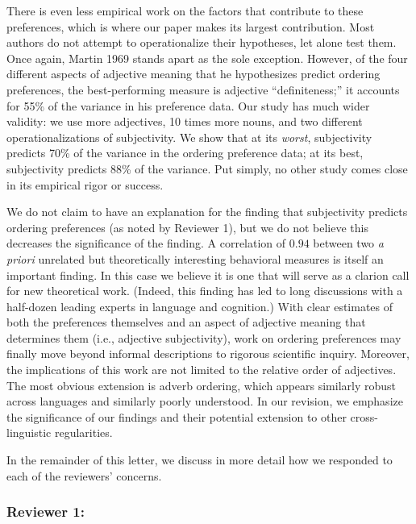\documentclass[12pt]{article}
\begin{document}
There is even less empirical work on the factors that contribute to these preferences, which is where our paper makes its largest contribution. Most authors do not attempt to operationalize their hypotheses, let alone test them. Once again, Martin 1969 stands apart as the sole exception. However, of the four different aspects of adjective meaning that he hypothesizes predict ordering preferences, the best-performing measure is adjective ``definiteness;'' it accounts for 55\% of the variance in his preference data. Our study has much wider validity: we use more adjectives, 10 times more nouns, and two different operationalizations of subjectivity. We show that at its \emph{worst}, subjectivity predicts 70\% of the variance in the ordering preference data; at its best, subjectivity predicts 88\% of the variance. Put simply, no other study comes close in its empirical rigor or success. 

We do not claim to have an explanation for the finding that subjectivity predicts ordering preferences (as noted by Reviewer 1), but we do not believe this decreases the significance of the finding. 
A correlation of $0.94$ between two \emph{a priori} unrelated but theoretically interesting behavioral measures is itself an important finding. In this case we believe it is one that will serve as a clarion call for new theoretical work.
(Indeed, this finding has led to long discussions with a half-dozen leading experts in language and cognition.)
With clear estimates of both the preferences themselves and an aspect of adjective meaning that determines them (i.e., adjective subjectivity), work on ordering preferences may finally move beyond informal descriptions to rigorous scientific inquiry. 
%
Moreover, the implications of this work are not limited to the relative order of adjectives. The most obvious extension is adverb ordering, which appears similarly robust across languages and similarly poorly understood. In our revision, we emphasize the significance of our findings and their potential extension to other cross-linguistic regularities.

In the remainder of this letter, we discuss in more detail how we responded to each of the reviewers' concerns.


\subsubsection*{Reviewer 1:}
\end{document}

